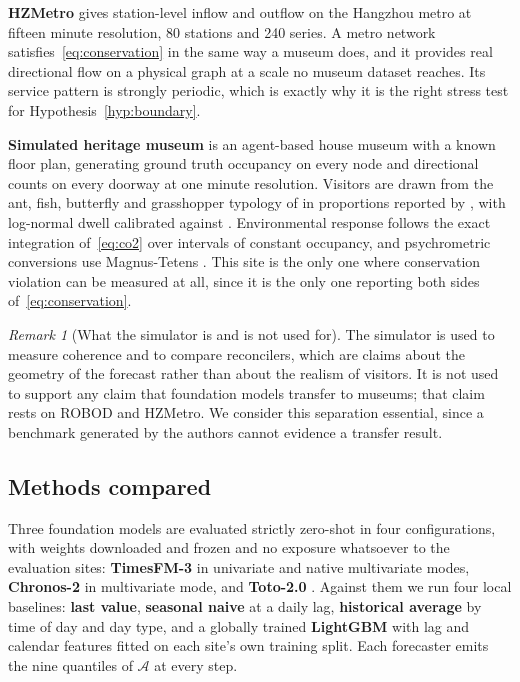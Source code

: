 \documentclass[utf8]{FrontiersinHarvard}
\theoremstyle{plain}
\theoremstyle{definition}
\theoremstyle{remark}
\newtheorem{remark}[theorem]{Remark}
\begin{document}
\textbf{HZMetro} \citep{liu2022pvcgn} gives station-level inflow and outflow on the Hangzhou metro at fifteen minute resolution, \num{80} stations and \num{240} series. A metro network satisfies~\eqref{eq:conservation} in the same way a museum does, and it provides real directional flow on a physical graph at a scale no museum dataset reaches. Its service pattern is strongly periodic, which is exactly why it is the right stress test for Hypothesis~\ref{hyp:boundary}.

\textbf{Simulated heritage museum} is an agent-based house museum with a known floor plan, generating ground truth occupancy on every node and directional counts on every doorway at one minute resolution. Visitors are drawn from the ant, fish, butterfly and grasshopper typology of \citet{veron1983} in proportions reported by \citet{zancanaro2007}, with log-normal dwell calibrated against \citet{yoshimura2014louvre}. Environmental response follows the exact integration of~\eqref{eq:co2} over intervals of constant occupancy, and psychrometric conversions use Magnus-Tetens \citep{alduchov1996}. This site is the only one where conservation violation can be measured at all, since it is the only one reporting both sides of~\eqref{eq:conservation}.

\begin{remark}[What the simulator is and is not used for]
\label{rem:sim}
The simulator is used to measure coherence and to compare reconcilers, which are claims about the geometry of the forecast rather than about the realism of visitors. It is not used to support any claim that foundation models transfer to museums; that claim rests on ROBOD and HZMetro. We consider this separation essential, since a benchmark generated by the authors cannot evidence a transfer result.
\end{remark}

\subsection{Methods compared}

Three foundation models are evaluated strictly zero-shot in four configurations, with weights downloaded and frozen and no exposure whatsoever to the evaluation sites: \textbf{TimesFM-3} \citep{timesfm3} in univariate and native multivariate modes, \textbf{Chronos-2} \citep{ansari2025chronos2} in multivariate mode, and \textbf{Toto-2.0} \citep{khwaja2026toto2}. Against them we run four local baselines: \textbf{last value}, \textbf{seasonal naive} at a daily lag, \textbf{historical average} by time of day and day type, and a globally trained \textbf{LightGBM} with lag and calendar features fitted on each site's own training split. Each forecaster emits the nine quantiles of $\mathcal{A}$ at every step.
\end{document}
